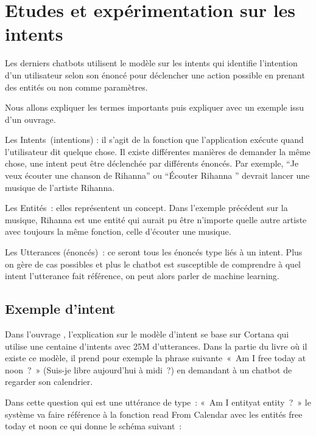 \section{Etudes et expérimentation sur les intents}

Les derniers chatbots utilisent le modèle sur les intents qui identifie l’intention d’un utilisateur selon son énoncé pour déclencher une action possible en prenant des entités ou non comme paramètres.
\vspace{1em}

	Nous allons expliquer les termes importants puis expliquer avec un exemple issu d’un ouvrage.
\vspace{1em}

Les Intents (intentions) : il s’agit de la fonction que l’application exécute quand l’utilisateur dit quelque chose. Il existe différentes manières de demander la même chose, une intent peut être déclenchée par différents énoncés. Par exemple, “Je veux écouter une chanson de Rihanna” ou “Écouter Rihanna ” devrait lancer une musique de l’artiste Rihanna.
\vspace{1em}

Les Entités : elles représentent un concept. Dans l’exemple précédent sur la musique, Rihanna est une entité qui aurait pu être n’importe quelle autre artiste avec toujours la même fonction, celle d’écouter une musique.
\vspace{1em}

Les Utterances (énoncés) : ce seront tous les énoncés type liés à un intent. Plus on gère de cas possibles et plus le chatbot est susceptible de comprendre à quel intent l’utterance fait référence,  on peut alors parler de machine learning.
\vspace{1em}


\subsection{Exemple d’intent}

Dans l’ouvrage \cite{ref14}, l’explication sur le modèle d’intent se base sur Cortana qui utilise une centaine d’intents avec 25M d’utterances. Dans la partie du livre où il existe ce modèle, il prend pour exemple la phrase suivante « Am I free today at noon ? » (Suis-je libre aujourd’hui à midi ?) en demandant à un chatbot de regarder son calendrier.
\vspace{1em}

	Dans cette question qui est une uttérance de type : « Am I entityat entity ? » le système va faire référence à la fonction read From Calendar avec les entités free today et noon ce qui donne le schéma suivant :
	\vspace{1em}
	
